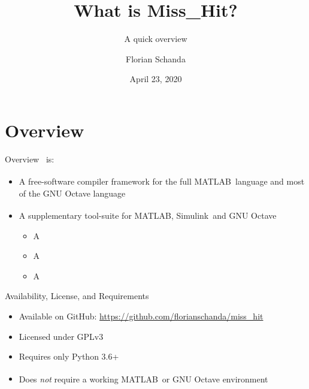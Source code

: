 \documentclass{beamer}
\author{Florian Schanda}
\title{What is {\sc Miss\_Hit}?}
\subtitle{A quick overview}
\date{April 23, 2020}
\newcommand{\mh}[0]{{\sc\structure{Miss\_Hit}}}
\newcommand{\matlab}[0]{MATLAB\textsuperscript{\tiny\textregistered}}
\newcommand{\simulink}[0]{Simulink\textsuperscript{\tiny\textregistered}}
\begin{document}
\maketitle

{}

\section{Overview}
\begin{frame}{Overview}
  \mh~is:
  \begin{itemize}
  \item A free-software compiler framework for the full \matlab\
    language and most of the GNU Octave language \pause
  \item A supplementary tool-suite for \matlab, \simulink\ and GNU
    Octave
    \begin{itemize}
    \item A 
    \item A 
    \item A 
    \end{itemize}
  \end{itemize}
\end{frame}

\begin{frame}{Availability, License, and Requirements}
  \begin{itemize}
  \item Available on GitHub: \url{https://github.com/florianschanda/miss_hit}
  \item Licensed under GPLv3
    \pause
  \item Requires only Python 3.6+
  \item Does \emph{not} require a working \matlab\ or GNU Octave
    environment
  \end{itemize}
\end{frame}
\end{document}
